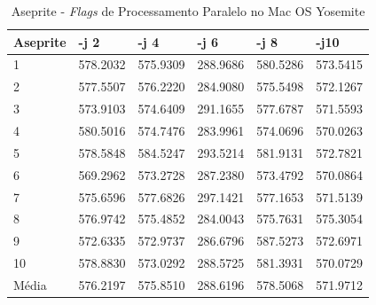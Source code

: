 \begin{apendicesenv}
\begin{table}[!ht]
\centering
\tiny
\caption{Aseprite - \textit{Flags} de Processamento Paralelo no Mac OS Yosemite}
\label{tab:flag_processamento_paralelo:mac:aseprite}
\begin{tabular}{llllll}
\textbf{Aseprite} & \textbf{-j 2} & \textbf{-j 4} & \textbf{-j 6} & \textbf{-j 8} & \textbf{-j10}  \\ \toprule
1                 & 578.2032      &   575.9309    &    288.9686   &     580.5286  &   573.5415  \\ 
2                 & 577.5507      &   576.2220    &    284.9080   &     575.5498  &   572.1267  \\ 
3                 & 573.9103      &   574.6409    &    291.1655   &     577.6787  &   571.5593  \\ 
4                 & 580.5016      &   574.7476    &    283.9961   &     574.0696  &   570.0263  \\ 
5                 & 578.5848      &   584.5247    &    293.5214   &     581.9131  &   572.7821  \\ 
6                 & 569.2962      &   573.2728    &    287.2380   &     573.4792  &   570.0864  \\ 
7                 & 575.6596      &   577.6826    &    297.1421   &     577.1653  &   571.5139  \\ 
8                 & 576.9742      &   575.4852    &    284.0043   &     575.7631  &   575.3054  \\ 
9                 & 572.6335      &   572.9737    &    286.6796   &     587.5273  &   572.6971  \\ 
10                & 578.8830      &   573.0292    &    288.5725   &     581.3931  &   570.0729  \\ \bottomrule
Média             & 576.2197      &   575.8510    &    288.6196   &     578.5068  &   571.9712  \\ 
\end{tabular}
\end{table}



\end{apendicesenv}
